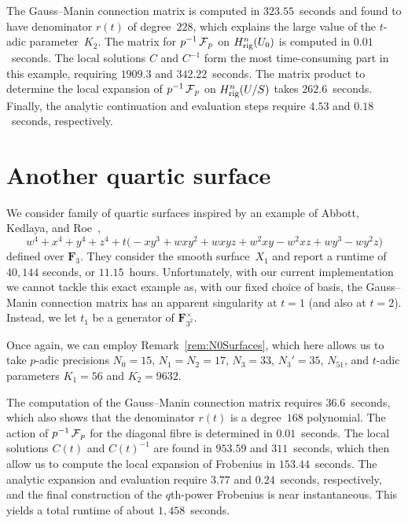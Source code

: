 The Gauss--Manin connection matrix is computed in $323.55$~seconds and found 
to have denominator $r(t)$ of degree~$228$, which explains the large value 
of the $t$-adic parameter~$K_2$.  The matrix for $p^{-1} \operatorname{\mathcal{F}}_p$ on 
$H_{\text{rig}}^{n}(U_0)$ is computed in $0.01$~seconds.  The local 
solutions $C$ and $C^{-1}$ form the most time-consuming part in this example, 
requiring $1909.3$ and $342.22$~seconds.  The matrix product to determine the 
local expansion of $p^{-1} \operatorname{\mathcal{F}}_p$ on $H_{\text{rig}}^{n}(U/S)$ 
takes $262.6$~seconds. Finally, the analytic continuation and evaluation steps 
require $4.53$ and $0.18$~seconds, respectively.

\section{Another quartic surface}

We consider family of quartic surfaces inspired by an example of 
Abbott, Kedlaya, and Roe~\citep[Example~4.2.1]{AbbottKedlayaRoe2006}, 
\begin{equation*}
w^4 + x^4 + y^4 + z^4 + t \bigl(
    -x y^3 + w x y^2 + w x y z  + w^2 x y - w^2 x z + w y^3 - w y^2 z \bigr) 
\end{equation*}
defined over $\mathbf{F}_3$.  They consider the smooth surface~$X_1$ 
and report a runtime of $40,144$ seconds, or $11.15$~hours.  Unfortunately, 
with our current implementation we cannot tackle this exact example 
as, with our fixed choice of basis, the Gauss--Manin connection matrix 
has an apparent singularity at $t = 1$ (and also at $t = 2$).  Instead, 
we let $t_1$ be a generator of $\mathbf{F}_{3^2}^{\times}$.

Once again, we can employ Remark~\ref{rem:N0Surfaces}, which here allows 
us to take $p$-adic precisions $N_0 = 15$, $N_1 = N_2 = 17$, $N_3 = 33$, 
$N_3' = 35$, $N_51$, and $t$-adic parameters $K_1 = 56$ and $K_2 = 9632$.

The computation of the Gauss--Manin connection matrix requires $36.6$~seconds, 
which also shows that the denominator $r(t)$ is a degree~$168$ polynomial.
The action of $p^{-1} \operatorname{\mathcal{F}}_p$ for the diagonal fibre is determined in 
$0.01$~seconds.  The local solutions $C(t)$ and $C(t)^{-1}$ are found in 
$953.59$ and $311$~seconds, which then allow us to compute the local expansion 
of Frobenius in $153.44$~seconds.  The analytic expansion and 
evaluation require $3.77$ and $0.24$~seconds, respectively, and the final 
construction of the $q$th-power Frobenius is near instantaneous. 
This yields a total runtime of about $1,458$~seconds.

